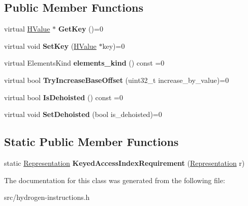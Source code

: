 \subsection*{Public Member Functions}
\begin{DoxyCompactItemize}
\item 
\hypertarget{classv8_1_1internal_1_1_array_instruction_interface_a3b00965803a4aa2d245049e197386bb9}{}virtual \hyperlink{classv8_1_1internal_1_1_h_value}{H\+Value} $\ast$ {\bfseries Get\+Key} ()=0\label{classv8_1_1internal_1_1_array_instruction_interface_a3b00965803a4aa2d245049e197386bb9}

\item 
\hypertarget{classv8_1_1internal_1_1_array_instruction_interface_a69d53bd082b5e37c7921cedcfcec11ca}{}virtual void {\bfseries Set\+Key} (\hyperlink{classv8_1_1internal_1_1_h_value}{H\+Value} $\ast$key)=0\label{classv8_1_1internal_1_1_array_instruction_interface_a69d53bd082b5e37c7921cedcfcec11ca}

\item 
\hypertarget{classv8_1_1internal_1_1_array_instruction_interface_aac09602c5f8429516b4ec69a671c9c32}{}virtual Elements\+Kind {\bfseries elements\+\_\+kind} () const =0\label{classv8_1_1internal_1_1_array_instruction_interface_aac09602c5f8429516b4ec69a671c9c32}

\item 
\hypertarget{classv8_1_1internal_1_1_array_instruction_interface_a5413df5ba2cb580d7687ae5a44f43123}{}virtual bool {\bfseries Try\+Increase\+Base\+Offset} (uint32\+\_\+t increase\+\_\+by\+\_\+value)=0\label{classv8_1_1internal_1_1_array_instruction_interface_a5413df5ba2cb580d7687ae5a44f43123}

\item 
\hypertarget{classv8_1_1internal_1_1_array_instruction_interface_aeb68f8c83fb80f901517fb90237a1bca}{}virtual bool {\bfseries Is\+Dehoisted} () const =0\label{classv8_1_1internal_1_1_array_instruction_interface_aeb68f8c83fb80f901517fb90237a1bca}

\item 
\hypertarget{classv8_1_1internal_1_1_array_instruction_interface_a83bec181df124504e55948b6847f60ac}{}virtual void {\bfseries Set\+Dehoisted} (bool is\+\_\+dehoisted)=0\label{classv8_1_1internal_1_1_array_instruction_interface_a83bec181df124504e55948b6847f60ac}

\end{DoxyCompactItemize}
\subsection*{Static Public Member Functions}
\begin{DoxyCompactItemize}
\item 
\hypertarget{classv8_1_1internal_1_1_array_instruction_interface_a3e05ea86b4cb765cfb92f4b5f5b504f5}{}static \hyperlink{classv8_1_1internal_1_1_representation}{Representation} {\bfseries Keyed\+Access\+Index\+Requirement} (\hyperlink{classv8_1_1internal_1_1_representation}{Representation} r)\label{classv8_1_1internal_1_1_array_instruction_interface_a3e05ea86b4cb765cfb92f4b5f5b504f5}

\end{DoxyCompactItemize}


The documentation for this class was generated from the following file\+:\begin{DoxyCompactItemize}
\item 
src/hydrogen-\/instructions.\+h\end{DoxyCompactItemize}

